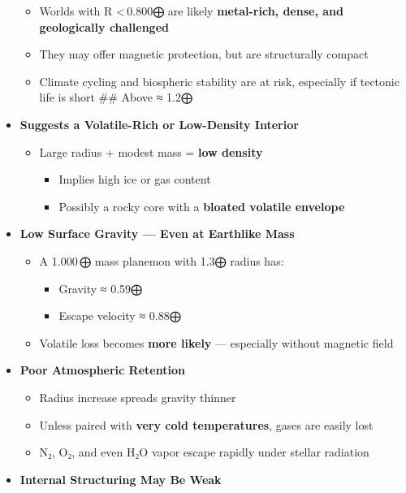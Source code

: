 \documentclass[
  letterpaper,
]{book}
\providecommand{\tightlist}{%
  \setlength{\itemsep}{0pt}\setlength{\parskip}{0pt}}
\begin{document}
\begin{itemize}
  \begin{itemize}
  \tightlist
  \item
    Worlds with R \textless\,0.800⨁ are likely \textbf{metal-rich,
    dense, and geologically challenged}
  \item
    They may offer magnetic protection, but are structurally compact
  \item
    Climate cycling and biospheric stability are at risk, especially if
    tectonic life is short \#\# Above ≈ 1.2⨁
  \end{itemize}
\item
  \textbf{Suggests a Volatile-Rich or Low-Density Interior}

  \begin{itemize}
  \tightlist
  \item
    Large radius + modest mass = \textbf{low density}

    \begin{itemize}
    \tightlist
    \item
      Implies high ice or gas content
    \item
      Possibly a rocky core with a \textbf{bloated volatile envelope}
    \end{itemize}
  \end{itemize}
\item
  \textbf{Low Surface Gravity --- Even at Earthlike Mass}

  \begin{itemize}
  \tightlist
  \item
    A 1.000\,⨁ mass planemon with 1.3⨁ radius has:

    \begin{itemize}
    \tightlist
    \item
      Gravity ≈ 0.59⨁
    \item
      Escape velocity ≈ 0.88⨁
    \end{itemize}
  \item
    Volatile loss becomes \textbf{more likely} --- especially without
    magnetic field
  \end{itemize}
\item
  \textbf{Poor Atmospheric Retention}

  \begin{itemize}
  \tightlist
  \item
    Radius increase spreads gravity thinner
  \item
    Unless paired with \textbf{very cold temperatures}, gases are easily
    lost
  \item
    N₂, O₂, and even H₂O vapor escape rapidly under stellar radiation
  \end{itemize}
\item
  \textbf{Internal Structuring May Be Weak}


\end{itemize}
\end{document}
